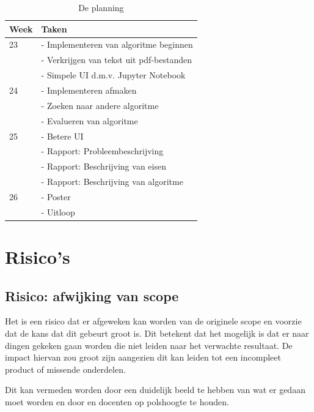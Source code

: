 \documentclass{article}
\begin{document}
\begin{table}[ht]
  \centering
  \begin{tabular}{|l|l|}
    \hline
    \textbf{Week} & \textbf{Taken}                           \\
    \hline
    23            & - Implementeren van algoritme beginnen   \\
                  & - Verkrijgen van tekst uit pdf-bestanden \\
                  & - Simpele UI d.m.v. Jupyter Notebook     \\
    \hline
    24            & - Implementeren afmaken                  \\
                  & - Zoeken naar andere algoritme           \\
                  & - Evalueren van algoritme                \\
    \hline
    25            & - Betere UI                              \\
                  & - Rapport: Probleembeschrijving          \\
                  & - Rapport: Beschrijving van eisen        \\
                  & - Rapport: Beschrijving van algoritme    \\
    \hline
    26            & - Poster                                 \\
                  & - Uitloop                                \\
    \hline
  \end{tabular}
  \caption{De planning}
  \label{tab:planning}
\end{table}

\section{Risico's}

\subsection{Risico: afwijking van scope}

Het is een risico dat er afgeweken kan worden van de originele scope en voorzie
dat de kans dat dit gebeurt groot is. Dit betekent dat het mogelijk is dat er
naar dingen gekeken gaan worden die niet leiden naar het verwachte resultaat. De
impact hiervan zou groot zijn aangezien dit kan leiden tot een incompleet
product of missende onderdelen.

Dit kan vermeden worden door een duidelijk beeld te hebben van wat er gedaan
moet worden en door en docenten op polshoogte te houden.
\end{document}
